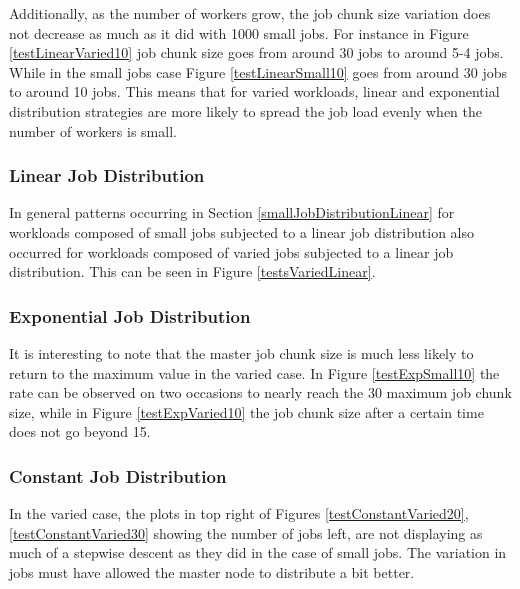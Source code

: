 \documentclass{article}
\begin{document}
Additionally, as the number of workers grow, the job chunk size variation does not decrease as much as it did with 1000 small jobs. For instance in Figure \ref{testLinearVaried10} job chunk size goes from around 30 jobs to around 5-4 jobs. While in the small jobs case Figure \ref{testLinearSmall10} goes from around 30 jobs to around 10 jobs. This means that for varied workloads, linear and exponential distribution strategies are more likely to spread the job load evenly when the number of workers is small.

\subsubsection{Linear Job Distribution} \label{variedJobDistributionLinear}
In general patterns occurring in Section \ref{smallJobDistributionLinear} for workloads composed of small jobs subjected to a linear job distribution also occurred for workloads composed of varied jobs subjected to a linear job distribution. This can be seen in Figure \ref{testsVariedLinear}.

\subsubsection{Exponential Job Distribution} \label{variedJobDistributionExp}
It is interesting to note that the master job chunk size is much less likely to return to the maximum value in the varied case. In Figure \ref{testExpSmall10} the rate can be observed on two occasions to nearly reach the 30 maximum job chunk size, while in Figure \ref{testExpVaried10} the job chunk size after a certain time does not go beyond 15.

\subsubsection{Constant Job Distribution} \label{variedJobDistributionConstant}
In the varied case, the plots in top right of Figures \ref{testConstantVaried20}, \ref{testConstantVaried30} showing the number of jobs left, are not displaying as much of a stepwise descent as they did in the case of small jobs. The variation in jobs must have allowed the master node to distribute a bit better.
\end{document}
